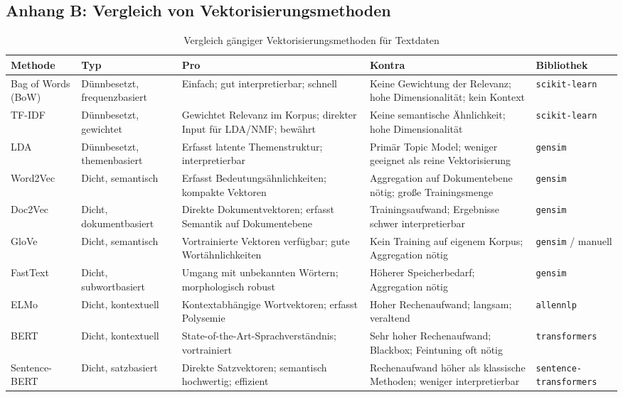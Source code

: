\documentclass[a4paper,11pt]{article}
\renewcommand{\footnotesize}{\fontsize{10}{12}\selectfont}
\begin{document}
\subsection*{Anhang B: Vergleich von Vektorisierungsmethoden}

\begin{table}[H]
\centering
\caption{Vergleich gängiger Vektorisierungsmethoden für Textdaten \parencite[S.~210--211]{wang2020empirical}}
\label{tab:vektorisierung}
\footnotesize
\setlength{\parskip}{0pt}
\renewcommand{\arraystretch}{1.4}
\begin{tabular}{>{\raggedright\arraybackslash}p{2.2cm} p{2.0cm} p{3.2cm} p{3.2cm} p{2.2cm}}
\toprule
\textbf{Methode} & \textbf{Typ} & \textbf{Pro} & \textbf{Kontra} & \textbf{Bibliothek} \\
\midrule
Bag of Words (BoW) & Dünnbesetzt, frequenzbasiert & Einfach; gut interpretierbar; schnell & Keine Gewichtung der Relevanz; hohe Dimensionalität; kein Kontext & \texttt{scikit-learn} \\
\hline
TF-IDF & Dünnbesetzt, gewichtet & Gewichtet Relevanz im Korpus; direkter Input für LDA/NMF; bewährt & Keine semantische Ähnlichkeit; hohe Dimensionalität & \texttt{scikit-learn} \\
\hline
LDA & Dünnbesetzt, themenbasiert & Erfasst latente Themenstruktur; interpretierbar & Primär Topic Model; weniger geeignet als reine Vektorisierung & \texttt{gensim} \\
\hline
Word2Vec & Dicht, semantisch & Erfasst Bedeutungsähnlichkeiten; kompakte Vektoren & Aggregation auf Dokumentebene nötig; große Trainingsmenge & \texttt{gensim} \\
\hline
Doc2Vec & Dicht, dokumentbasiert & Direkte Dokumentvektoren; erfasst Semantik auf Dokumentebene & Trainingsaufwand; Ergebnisse schwer interpretierbar & \texttt{gensim} \\
\hline
GloVe & Dicht, semantisch & Vortrainierte Vektoren verfügbar; gute Wortähnlichkeiten & Kein Training auf eigenem Korpus; Aggregation nötig & \texttt{gensim} / manuell \\
\hline
FastText & Dicht, subwortbasiert & Umgang mit unbekannten Wörtern; morphologisch robust & Höherer Speicherbedarf; Aggregation nötig & \texttt{gensim} \\
\hline
ELMo & Dicht, kontextuell & Kontextabhängige Wortvektoren; erfasst Polysemie & Hoher Rechenaufwand; langsam; veraltend & \texttt{allennlp} \\
\hline
BERT & Dicht, kontextuell & State-of-the-Art-Sprachverständnis; vortrainiert & Sehr hoher Rechenaufwand; Blackbox; Feintuning oft nötig & \texttt{transformers} \\
\hline
Sentence-BERT & Dicht, satzbasiert & Direkte Satzvektoren; semantisch hochwertig; effizient & Rechenaufwand höher als klassische Methoden; weniger interpretierbar & \texttt{sentence-trans\-formers} \\
\bottomrule
\end{tabular}
\end{table}
\end{document}
